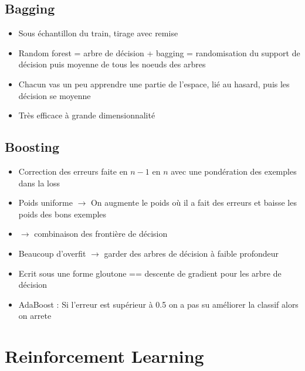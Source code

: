 \documentclass{article}
\theoremstyle{plain}%
\theoremstyle{definition}
\theoremstyle{remark}
\begin{document}
\subsection{Bagging}
\begin{itemize}
    \item Sous échantillon du train, tirage avec remise
    \item Random forest = arbre de décision + bagging = randomisation du support de décision puis moyenne de tous les noeuds des arbres 
    \item Chacun vas un peu apprendre une partie de l'espace, lié au hasard, puis les décision se moyenne
    \item Très efficace à grande dimensionnalité
\end{itemize}

\subsection{Boosting}
\begin{itemize}
    \item Correction des erreurs faite en $ n-1 $ en $ n $ avec une pondération des exemples dans la loss
    \item Poids uniforme $\rightarrow$ On augmente le poids où il a fait des erreurs et baisse les poids des bons exemples
    \item $\rightarrow$ combinaison des frontière de décision
    \item Beaucoup d'overfit $\rightarrow$ garder des arbres de décision à faible profondeur
    \item Ecrit sous une forme gloutone == descente de gradient pour les arbre de décision 
    \item AdaBoost : Si l'erreur est supérieur à 0.5 on a pas su améliorer la classif alors on arrete
\end{itemize}


\section{Reinforcement Learning}
\end{document}
